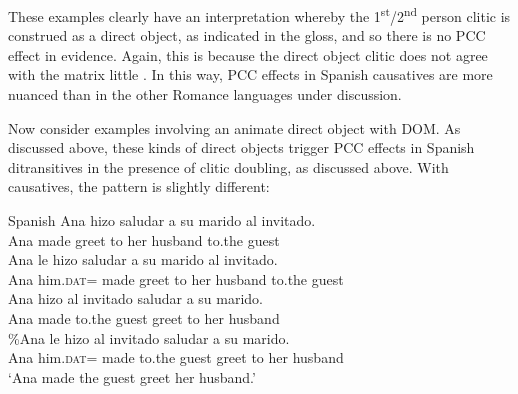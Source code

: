 \documentclass[output=paper,colorlinks,citecolor=brown,nonflat]{langsci/langscibook}
\begin{document}
These examples clearly have an interpretation whereby the 1\textsuperscript{st}/2\textsuperscript{nd} person clitic is construed as a direct object, as indicated in the gloss, and so there is no PCC effect in evidence. Again, this is because the direct object clitic does not agree with the matrix little \liv . In this way, PCC effects in Spanish causatives are more nuanced than in the other Romance languages under discussion.

Now consider examples involving an animate direct object with DOM. As discussed above, these kinds of direct objects trigger PCC effects in Spanish ditransitives in the presence of clitic doubling, as discussed above. With causatives, the pattern is slightly different:

\ea%
    \label{ex:sheehan:35}
    Spanish
    \ea\label{ex:sheehan:35a}
    \gll    *Ana   hizo   saludar   a   su   marido   al    invitado.\\
            Ana   made   greet   to   her   husband  to.the   guest\\
    \ex\label{ex:sheehan:35b}
    \gll    *Ana   le   hizo   saludar   a   su   marido   al   invitado.\\
            Ana   him.\textsc{dat}=   made   greet   to   her husband to.the   guest\\
    \ex\label{ex:sheehan:35c}
    \gll    Ana   hizo     al     invitado   saludar   a   su   marido.\\
            Ana   made   to.the   guest   greet   to   her   husband\\
    \ex\label{ex:sheehan:35d}
    \gll    \%Ana le   hizo   al   invitado saludar   a     su   marido.\\
            Ana   him.\textsc{dat}=   made   to.the   guest   greet   to   her   husband\\
    \glt    ‘Ana made the guest greet her husband.’
    \z
\z
\end{document}
